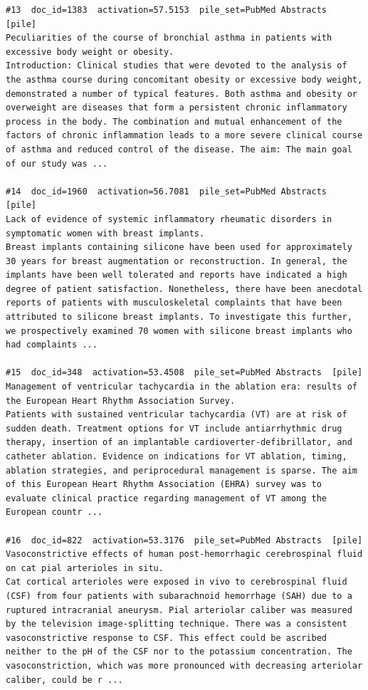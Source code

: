 \begin{verbatim}
#13  doc_id=1383  activation=57.5153  pile_set=PubMed Abstracts  [pile]
Peculiarities of the course of bronchial asthma in patients with excessive body weight or obesity.
Introduction: Clinical studies that were devoted to the analysis of the asthma course during concomitant obesity or excessive body weight, demonstrated a number of typical features. Both asthma and obesity or overweight are diseases that form a persistent chronic inflammatory process in the body. The combination and mutual enhancement of the factors of chronic inflammation leads to a more severe clinical course of asthma and reduced control of the disease. The aim: The main goal of our study was ...

#14  doc_id=1960  activation=56.7081  pile_set=PubMed Abstracts  [pile]
Lack of evidence of systemic inflammatory rheumatic disorders in symptomatic women with breast implants.
Breast implants containing silicone have been used for approximately 30 years for breast augmentation or reconstruction. In general, the implants have been well tolerated and reports have indicated a high degree of patient satisfaction. Nonetheless, there have been anecdotal reports of patients with musculoskeletal complaints that have been attributed to silicone breast implants. To investigate this further, we prospectively examined 70 women with silicone breast implants who had complaints ...

#15  doc_id=348  activation=53.4508  pile_set=PubMed Abstracts  [pile]
Management of ventricular tachycardia in the ablation era: results of the European Heart Rhythm Association Survey.
Patients with sustained ventricular tachycardia (VT) are at risk of sudden death. Treatment options for VT include antiarrhythmic drug therapy, insertion of an implantable cardioverter-defibrillator, and catheter ablation. Evidence on indications for VT ablation, timing, ablation strategies, and periprocedural management is sparse. The aim of this European Heart Rhythm Association (EHRA) survey was to evaluate clinical practice regarding management of VT among the European countr ...

#16  doc_id=822  activation=53.3176  pile_set=PubMed Abstracts  [pile]
Vasoconstrictive effects of human post-hemorrhagic cerebrospinal fluid on cat pial arterioles in situ.
Cat cortical arterioles were exposed in vivo to cerebrospinal fluid (CSF) from four patients with subarachnoid hemorrhage (SAH) due to a ruptured intracranial aneurysm. Pial arteriolar caliber was measured by the television image-splitting technique. There was a consistent vasoconstrictive response to CSF. This effect could be ascribed neither to the pH of the CSF nor to the potassium concentration. The vasoconstriction, which was more pronounced with decreasing arteriolar caliber, could be r ...


\end{verbatim}

